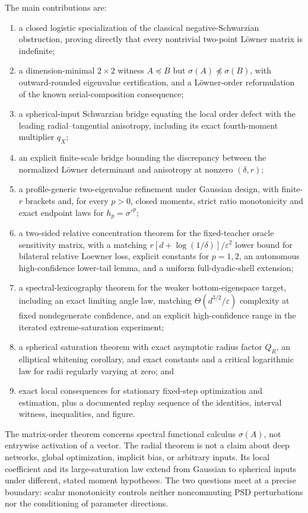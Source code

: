 \documentclass[11pt]{article}
\begin{document}
The main contributions are:
\begin{enumerate}[leftmargin=2em]
 \item a closed logistic specialization of the classical negative-Schwarzian obstruction, proving directly that
 every nontrivial two-point L\"owner matrix is indefinite;
 \item a dimension-minimal $2\times2$ witness $A\preceq B$ but $\sigma(A)\npreceq\sigma(B)$, with
 outward-rounded eigenvalue certification, and a L\"owner-order reformulation of the known serial-composition
 consequence;
 \item a spherical-input Schwarzian bridge equating the local order defect with the leading
 radial--tangential anisotropy, including its exact fourth-moment multiplier $q_X$;
 \item an explicit finite-scale bridge bounding the discrepancy between the normalized L\"owner determinant
 and anisotropy at nonzero $(\delta,r)$;
 \item a profile-generic two-eigenvalue refinement under Gaussian design, with finite-$r$ brackets and, for
 every $p>0$, closed moments, strict ratio monotonicity and exact endpoint laws for $h_p=\sigma'^p$;
 \item a two-sided relative concentration theorem for the fixed-teacher oracle sensitivity matrix, with a matching
 $r[d+\log(1/\delta)]/\varepsilon^2$ lower bound for bilateral relative Loewner loss, explicit constants for
 $p=1,2$, an autonomous high-confidence lower-tail lemma, and a uniform full-dyadic-shell extension;
 \item a spectral-lexicography theorem for the weaker bottom-eigenspace target, including an exact limiting angle
 law, matching $\Theta(d^{3/2}/\varepsilon)$ complexity at fixed nondegenerate confidence, and an explicit
 high-confidence range in the iterated extreme-saturation experiment;
 \item a spherical saturation theorem with exact asymptotic radius factor $Q_R$, an elliptical whitening
 corollary, and exact constants and a critical logarithmic law for radii regularly varying at zero; and
 \item exact local consequences for stationary fixed-step optimization and estimation, plus a documented replay sequence
 of the identities,
 interval witness, inequalities, and figure.
\end{enumerate}

The matrix-order theorem concerns spectral functional calculus $\sigma(A)$, not entrywise activation of a vector.
The radial theorem is not a claim about deep networks, global optimization, implicit bias, or arbitrary inputs.  Its
local coefficient and its large-saturation law extend from Gaussian to spherical inputs under different, stated
moment hypotheses.  The
two questions meet at a precise boundary: scalar monotonicity controls neither noncommuting PSD perturbations nor
the conditioning of parameter directions.
\end{document}
